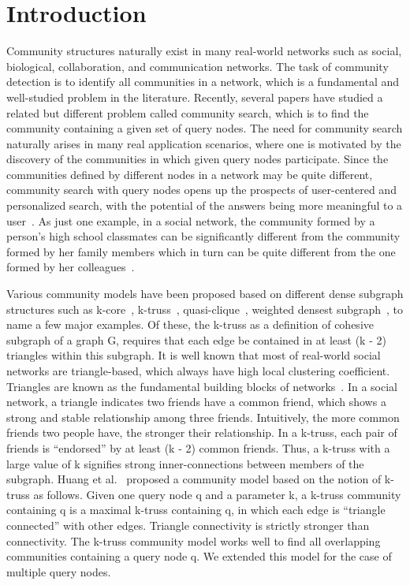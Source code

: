 \section{Introduction}
\label{introduction}

Community structures naturally exist in many real-world networks such as social, biological, collaboration, and communication networks. The task of community detection is to identify all communities in a network, which is a fundamental and well-studied problem in the literature. Recently, several papers have studied a
related but different problem called community search, which is to find the community containing a given set of query nodes. The need for community search naturally arises in many real application scenarios, where one is motivated by the discovery of the communities in which given query nodes participate. Since the communities defined by different nodes in a network may be quite different, community search with query nodes opens up the prospects of user-centered and personalized search, with the potential of the answers being more meaningful to a user~\cite{huang2014querying}. As just one example, in a social network, the community formed by a person's high school classmates can be significantly different from the community formed by her family members which in turn can be quite different from the one formed by her colleagues~\cite{mcauley2012learning}.

Various community models have been proposed based on different dense subgraph structures such as k-core~\cite{sozio2010community, cui2014local, li2015influential}, k-truss~\cite{huang2014querying}, quasi-clique~\cite{cui2013online}, weighted densest subgraph~\cite{wu2015robust}, to name a few major examples. Of these, the k-truss as a definition of cohesive subgraph of a graph G, requires that each edge be contained in at least (k - 2) triangles within this subgraph. It is well known that most of real-world social networks are triangle-based, which always have high local clustering coefficient. Triangles are known as the fundamental building blocks of networks~\cite{wang2012truss}. In a social network, a triangle indicates two friends have a common friend, which shows a strong and stable relationship among three friends. Intuitively, the more common friends two people have, the stronger their relationship. In a k-truss, each pair of friends is "`endorsed"' by at least (k - 2) common friends. Thus, a k-truss with a large value of k signifies strong inner-connections between members of the subgraph. Huang et al.~\cite{huang2014querying} proposed a community model based on the notion of k-truss as follows. Given one query node q and a parameter k, a k-truss community containing q is a maximal k-truss containing q, in which each edge is "`triangle connected"' with other edges. Triangle connectivity is strictly stronger than connectivity. The k-truss community model works well to find all overlapping communities containing a query node q. We extended this model for the case of multiple query nodes. 

